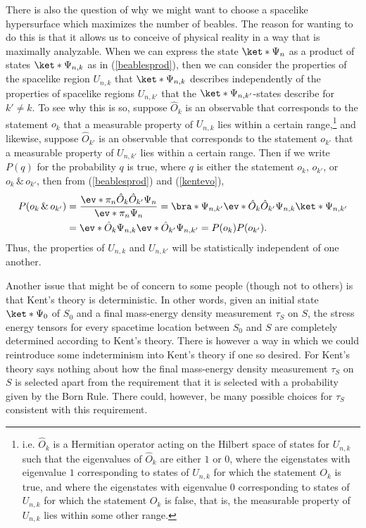 There is also the question of why we might want to choose a spacelike hypersurface which maximizes the number of beables. The reason for wanting to do this is that it allows us to conceive of physical reality in a way that is maximally analyzable. When we can express the state $\ket*{\Psi_n}$ as a product of states $\ket*{\Psi_{n,k}}$ as in (\ref{beablesprod}), then we can consider the properties of the spacelike region $U_{n,k}$ that $\ket*{\Psi_{n,k}}$ describes independently of the properties of  spacelike regions $U_{n,k'}$ that the $\ket*{\Psi_{n,k'}}$-states describe for $k'\neq k$. To see why this is so, suppose $\hat{O}_k$ is an observable that corresponds to the statement $o_k$ that a measurable property of $U_{n,k}$ lies within a certain range,\footnote{i.e. $\hat{O}_k$ is a Hermitian operator acting on the Hilbert space of states for $U_{n,k}$ such that the eigenvalues of $\hat{O}_k$ are either $1$ or $0$, where the eigenstates with eigenvalue $1$ corresponding to states of $U_{n,k}$ for which the statement $O_k$ is true, and  where the eigenstates with eigenvalue $0$ corresponding to states of $U_{n,k}$ for which the statement $O_k$ is false, that is, the measurable property of $U_{n,k}$ lies within some other range.} and likewise, suppose $\hat{O}_{k'}$ is an observable that corresponds to the statement $o_{k'}$ that a measurable property of $U_{n,k'}$ lies within a certain range. Then if we write $P(q)$ for the probability $q$ is true, where $q$ is either the statement $o_k$, $o_{k'}$, or $o_k\, \&\, o_{k'}$, then from (\ref{beablesprod}) and (\ref{kentevo}),
\begin{equation}
\begin{split}
P(o_k\, \&\, o_{k'})&=\frac{\ev*{\pi_n\hat{O}_k\hat{O}_{k'}}{\Psi_n}}{\ev*{\pi_n}{\Psi_n}}=\bra*{\Psi_{n,k'}}\ev*{\hat{O}_k\hat{O}_{k'}}{\Psi_{n,k}}\ket*{\Psi_{n,k'}}\\
&=\ev*{\hat{O}_k}{\Psi_{n,k}}\ev*{\hat{O}_{k'}}{\Psi_{n,k'}}=P(o_k)P(o_{k'}).
\end{split}
\end{equation}
Thus, the properties of $U_{n,k}$ and $U_{n,k'}$ will be statistically independent of one another.


Another issue that might be of concern to some people (though not to others) is that Kent's theory is deterministic. In other words, given an initial state $\ket*{\Psi_0}$ of $S_0$ and a final mass-energy density measurement $\tau_S$ on $S$, the stress energy tensors for every spacetime location between $S_0$ and $S$ are completely determined according to Kent's theory. There is however a way in which we could reintroduce some indeterminism into Kent's theory if one so desired. For Kent's theory says nothing about how the final mass-energy density measurement $\tau_S$ on $S$ is selected apart from the requirement that it is selected with a probability given by the Born Rule. There could, however, be many possible choices for $\tau_S$ consistent with this requirement. 

